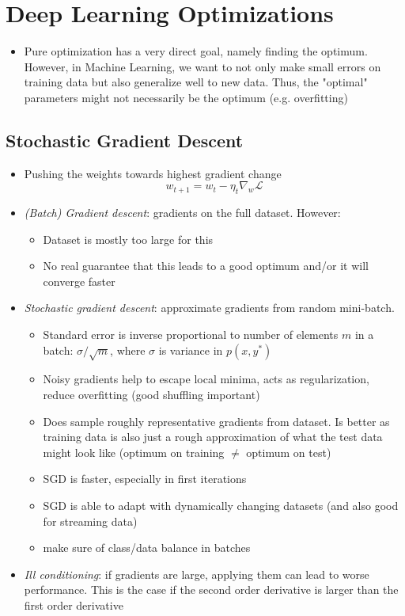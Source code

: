 \section{Deep Learning Optimizations}
\begin{itemize}
	\item Pure optimization has a very direct goal, namely finding the optimum. However, in Machine Learning, we want to not only make small errors on training data but also generalize well to new data. Thus, the "optimal" parameters might not necessarily be the optimum (e.g. overfitting)
\end{itemize}
\subsection{Stochastic Gradient Descent}
\begin{itemize}
	\item Pushing the weights towards highest gradient change
	$$w_{t+1} = w_{t} - \eta_t \nabla_{w} \mathcal{L}$$
	\item \textit{(Batch) Gradient descent}: gradients on the full dataset. However:
	\begin{itemize}
		\item Dataset is mostly too large for this
		\item No real guarantee that this leads to a good optimum and/or it will converge faster
	\end{itemize}
	\item \textit{Stochastic gradient descent}: approximate gradients from random mini-batch. 
	\begin{itemize}
		\item Standard error is inverse proportional to number of elements $m$ in a batch: $\sigma / \sqrt{m}$, where $\sigma$ is variance in $p(x,y^*)$
		\item Noisy gradients help to escape local minima, acts as regularization, reduce overfitting (good shuffling important)
		\item Does sample roughly representative gradients from dataset. Is better as training data is also just a rough approximation of what the test data might look like (optimum on training $\neq$ optimum on test)
		\item SGD is faster, especially in first iterations
		\item SGD is able to adapt with dynamically changing datasets (and also good for streaming data)
		\item make sure of class/data balance in batches
	\end{itemize}
	\item \textit{Ill conditioning}: if gradients are large, applying them can lead to worse performance. This is the case if the second order derivative is larger than the first order derivative
\end{itemize}
